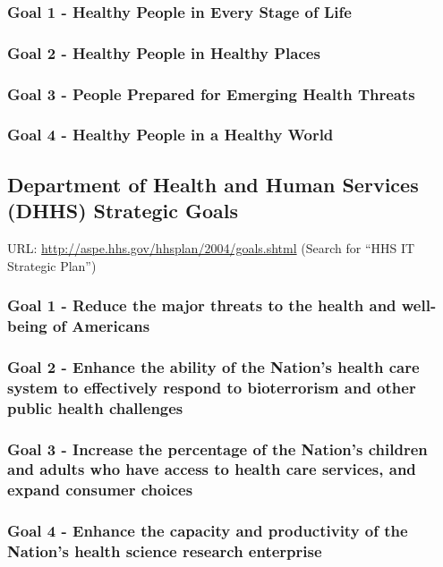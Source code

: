 \documentclass[11pt]{article}
\begin{document}
\subsubsection{Goal 1 - Healthy People in Every Stage of Life}
\label{sec:orgf4447a6}
\subsubsection{Goal 2 - Healthy People in Healthy Places}
\label{sec:org9011040}
\subsubsection{Goal 3 - People Prepared for Emerging Health Threats}
\label{sec:org3dc9c8f}
\subsubsection{Goal 4 - Healthy People in a Healthy World}
\label{sec:orge17459c}

\subsection{Department of Health and Human Services (DHHS) Strategic Goals}
\label{sec:org6818d05}
URL: \url{http://aspe.hhs.gov/hhsplan/2004/goals.shtml} (Search for “HHS IT Strategic Plan”)
\subsubsection{Goal 1 - Reduce the major threats to the health and well-being of Americans}
\label{sec:orgdced3d8}
\subsubsection{Goal 2 - Enhance the ability of the Nation’s health care system to effectively respond to bioterrorism and other public health challenges}
\label{sec:orgbc8be4c}
\subsubsection{Goal 3 - Increase the percentage of the Nation’s children and adults who have access to health care services, and expand consumer choices}
\label{sec:orgd5cf87f}
\subsubsection{Goal 4 - Enhance the capacity and productivity of the Nation’s health science research enterprise}
\label{sec:orgd332263}
\end{document}
